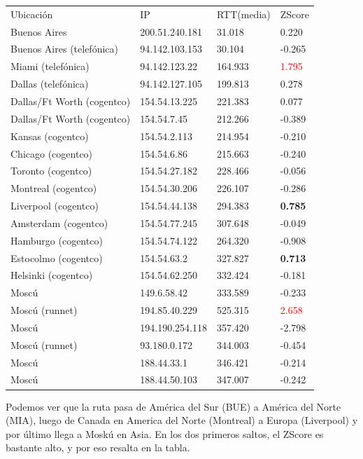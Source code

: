 \begin{tabular}{llll}
	Ubicaci\'on	&	IP	&	RTT(media)	&	ZScore	\\
	Buenos Aires	&	200.51.240.181	&	31.018	&	0.220	\\
	Buenos Aires (telef\'onica)	&	94.142.103.153	&	30.104	&	-0.265	\\
	Miami (telef\'onica)		&	94.142.123.22	&	164.933	&	\textcolor{red}{1.795}	\\
	Dallas (telef\'onica)		&	94.142.127.105	&	199.813	&	0.278	\\
	Dallas/Ft Worth (cogentco)	&	154.54.13.225	&	221.383	&	0.077	\\
	Dallas/Ft Worth (cogentco)	&	154.54.7.45	&	212.266	&	-0.389	\\
	Kansas (cogentco)		&	154.54.2.113	&	214.954	&	-0.210	\\
	Chicago (cogentco)		&	154.54.6.86	&	215.663	&	-0.240	\\
	Toronto (cogentco)		&	154.54.27.182	&	228.466	&	-0.056	\\
	Montreal (cogentco)	&	154.54.30.206	&	226.107	&	-0.286	\\
	Liverpool (cogentco)	&	154.54.44.138	&	294.383	&	\textbf{0.785}	\\
	Amsterdam (cogentco)	&	154.54.77.245	&	307.648	&	-0.049	\\
	Hamburgo (cogentco)	&	154.54.74.122	&	264.320	&	-0.908	\\
	Estocolmo (cogentco)	&	154.54.63.2	&	327.827	&	\textbf{0.713}	\\
	Helsinki (cogentco)		&	154.54.62.250	&	332.424	&	-0.181	\\
	Mosc\'u			&	149.6.58.42	&	333.589	&	-0.233	\\
	Mosc\'u (runnet)		&	194.85.40.229	&	525.315	&	\textcolor{red}{2.658}	\\
	Mosc\'u 			&	194.190.254.118	&	357.420	&	-2.798	\\
	Mosc\'u (runnet)		&	93.180.0.172	&	344.003	&	-0.454	\\
	Mosc\'u			&	188.44.33.1	&	346.421	&	-0.214 	\\
	Mosc\'u			&	188.44.50.103	&	347.007	&	-0.242	\\

\end{tabular}

Podemos ver que la ruta pasa de Am\'erica del Sur (BUE) a Am\'erica del Norte (MIA), luego de Canada en America del Norte (Montreal) a Europa (Liverpool) y por \'ultimo llega a Mosk\'u en Asia. En los dos primeros saltos, el ZScore es bastante alto, y por eso resalta en la tabla. 

